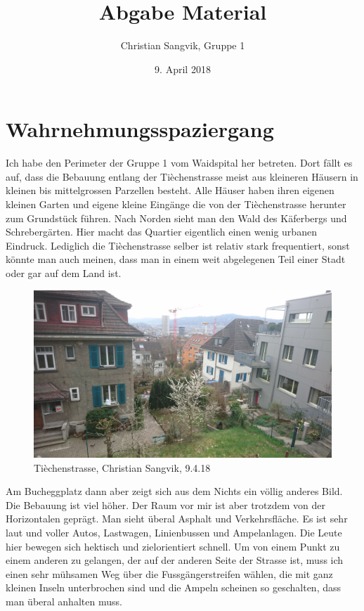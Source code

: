 \documentclass[a4paper,ngerman,11pt]{scrartcl}
\author{Christian Sangvik, Gruppe 1}
\date{9. April 2018}
\title{Abgabe Material}
\begin{document}
\maketitle


\section*{Wahrnehmungsspaziergang}
\label{sec-1}

Ich habe den Perimeter der Gruppe 1 vom Waidspital her betreten. Dort fällt es
auf, dass die Bebauung entlang der Tièchenstrasse meist aus kleineren Häusern
in kleinen bis mittelgrossen Parzellen besteht. Alle Häuser haben ihren
eigenen kleinen Garten und eigene kleine Eingänge die von der Tièchenstrasse
herunter zum Grundstück führen. Nach Norden sieht man den Wald
des Käferbergs und Schrebergärten. Hier macht das Quartier eigentlich einen
wenig urbanen Eindruck. Lediglich die Tièchenstrasse selber ist relativ stark
frequentiert, sonst könnte man auch meinen, dass man in einem weit abgelegenen
Teil einer Stadt oder gar auf dem Land ist.

\begin{figure}[H]
\centering
\includegraphics[width=\textwidth]{../Bilder/DSC_0522.JPG}
\caption{Tièchenstrasse, Christian Sangvik, 9.4.18}
\end{figure}

Am Bucheggplatz dann aber zeigt sich aus dem Nichts ein völlig anderes
Bild. Die Bebauung ist viel höher. Der Raum vor mir ist aber trotzdem von der
Horizontalen geprägt. Man sieht überal Asphalt und Verkehrsfläche. Es ist sehr laut
und voller Autos, Lastwagen, Linienbussen und Ampelanlagen. Die Leute hier
bewegen sich hektisch und zielorientiert schnell. Um von einem Punkt zu einem
anderen zu gelangen, der auf der anderen Seite der Strasse ist, muss ich einen
sehr mühsamen Weg über die Fussgängerstreifen wählen, die mit ganz kleinen
Inseln unterbrochen sind und die Ampeln scheinen so geschalten, dass man
überal anhalten muss.
\end{document}
